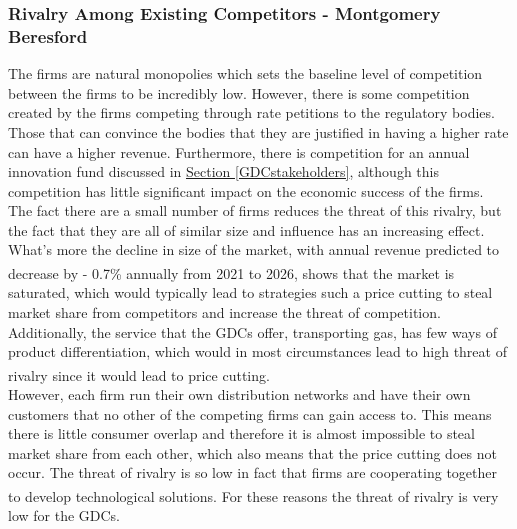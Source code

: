 \documentclass[11pt]{article}		%
\newcommand{\supercite}[1]{\textsuperscript{\cite{#1}}}		%
\newcommand{\sectref}[1]{\hyperref[#1]{Section \ref*{#1}}}     %
\begin{document}
         \subsubsection[Rivalry Among Existing Competitors]{Rivalry Among Existing Competitors - Montgomery Beresford}
                The firms are natural monopolies which sets the baseline level of competition between the firms to be incredibly low. However,
                there is some competition created by the firms competing through rate petitions to the regulatory bodies. Those that can convince the bodies that they are justified in having a higher rate can have a higher revenue. Furthermore, there is competition for an annual innovation fund discussed in \sectref{GDCstakeholders}, although this competition has little significant impact on the economic success of the firms.
                \\ 
                \hspace*{2ex}The fact there are a small number of firms reduces the threat of this rivalry, but the fact that they are all of similar size and influence has an increasing effect. What's more the decline in size of the market, with annual revenue predicted to decrease by - 0.7\% annually from 2021 to 2026\supercite{Gas_Distribution_Industry}, shows that the market is saturated, which would typically lead to strategies such a price cutting to steal market share from competitors and increase the threat of competition.
                 Additionally, the service that the GDCs offer, transporting gas, has few ways of product differentiation, which would in most circumstances lead to high threat of rivalry since it would lead to price cutting\supercite{Gas_Distribution_Industry}.
                 \\
                 \hspace*{2ex}However, each firm run their own distribution networks and have their own customers that no other of the competing firms can gain access to. This means there is little consumer overlap and therefore it is almost impossible to steal market share from each other, which also means that the price cutting does not occur. The threat of rivalry is so low in fact that firms are cooperating together to develop technological solutions\supercite{SGN-GD2}. For these reasons the threat of rivalry is very low for the GDCs.
           
\end{document}
